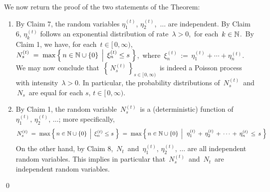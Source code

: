 
\vskip 0.5cm
\noindent
We now return the proof of the two statements of the Theorem:
\begin{enumerate}
\item
	By Claim 7, the random variables
	\;$\eta^{(t)}_{1}$, $\eta^{(t)}_{2}$, \,$\ldots$\;
	are independent.
	By Claim 6, \;$\eta^{(t)}_{k}$\; follows an exponential distribution of rate \,$\lambda > 0$,\,
	for each \,$k \in \mathbb{N}$.\,
	By Claim 1, we have, for each \,$t \in [\,0,\infty)$,
	\,$N^{(t)}_{s} \; = \; \max\left\{\,n\in\mathbb{N}\cup\{0\}\;\left\vert\;\,\xi^{(t)}_{n} \leq s\right.\,\right\}$,\,
	where \,$\xi^{(t)}_{n} \,:=\, \eta^{(t)}_{1} + \cdots + \eta^{(t)}_{n}$.
	We may now conclude that
	\,$\left\{\,N^{(t)}_{s}\,\right\}_{s\in[\,0,\infty)}$\, is indeed a Poisson process
	with intensity \,$\lambda > 0$.
	In particular, the probability distributions of \,$N^{(t)}_{s}$\, and \,$N_{s}$\,
	are equal for each $s,\,t \in [\,0,\infty)$.
\item
	By Claim 1, the random variable \,$N^{(t)}_{s}$\, is a (deterministic) function
	of \,$\eta^{(t)}_{1},\,\eta^{(t)}_{2},\,\ldots$\;;
	more specifically,
	\begin{equation*}
	N^{(t)}_{s}
	\; = \;
		\max\left\{\,n\in\mathbb{N}\cup\{0\}\;\left\vert\;\,\xi^{(t)}_{n} \leq s\right.\,\right\}
	\; = \;
		\max\left\{\,n\in\mathbb{N}\cup\{0\}\;\left\vert\;\
		\eta^{(t)}_{1} \,+\, \eta^{(t)}_{2} \,+\, \cdots \,+\, \eta^{(t)}_{n}
		\,\leq\,
		s\right.\,\right\}
	\end{equation*}
	On the other hand, by Claim 8, \,$N_{t}$\, and \,$\eta^{(t)}_{1},\,\eta^{(t)}_{2},\,\ldots$\;
	are all independent random variables.
	This implies in particular that \,$N^{(t)}_{s}$\, and \,$N_{t}$\, are independent random variables.
\end{enumerate}
\qed


